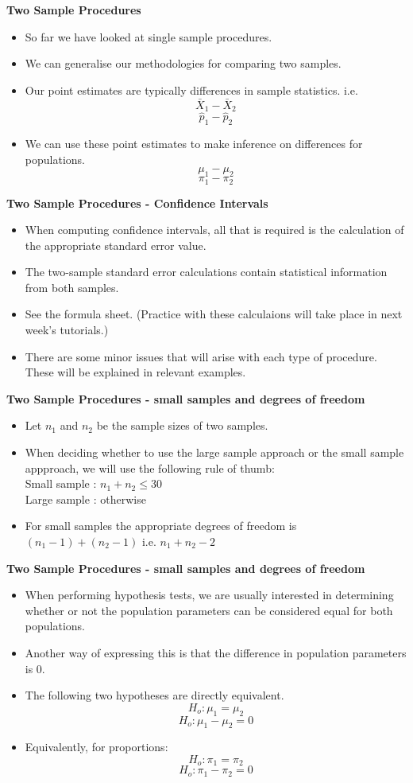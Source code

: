 \documentclass[a4]{beamer}
\begin{document}
\textbf{Two Sample Procedures}
\begin{itemize}
\item So far we have looked at single sample procedures.
\item We can generalise our methodologies for comparing two samples.
\item Our point estimates are typically differences in sample statistics. i.e.
\[ \bar{X}_1 - \bar{X}_2\]
\[\hat{p}_1 - \hat{p}_2 \]
\item We can use these point estimates to make inference on differences for populations.
\[ \mu_1 - \mu_2\]
\[ \pi_1 - \pi_2 \]
\end{itemize}


\noindent \textbf{Two Sample Procedures - Confidence Intervals}
\begin{itemize}
\item When computing confidence intervals, all that is required is the calculation of the appropriate standard error value.
\item The two-sample standard error calculations contain statistical information from both samples.
\item See the formula sheet. (Practice with these calculaions will take place in next week's tutorials.)
\item There are some minor issues that will arise with each type of procedure. These will be explained in relevant examples.
\end{itemize}


\noindent \textbf{Two Sample Procedures - small samples and degrees of freedom}
\begin{itemize}
\item Let $n_1$ and $n_2$ be the sample sizes of two samples.
\item When deciding whether to use the large sample approach or the small sample appproach, we will use the following rule of thumb: \\
Small sample : $n_1+n_2 \leq 30$\\
Large sample : otherwise\\
\item For small samples the appropriate degrees of freedom is $(n_1-1) + (n_2-1)$ i.e. $n_1 + n_2-2$ 
\end{itemize}


\textbf{Two Sample Procedures - small samples and degrees of freedom}
\begin{itemize}
\item When performing hypothesis tests, we are usually interested in determining whether or not the population parameters can be considered equal for both populations.
\item Another way of expressing this is that the difference in population parameters is 0. 
\item The following two hypotheses are directly equivalent.
\[ H_o :  \mu_1 = \mu_2\]
\[ H_o :  \mu_1 - \mu_2 =0\]
\item Equivalently, for proportions:
\[ H_o :  \pi_1 = \pi_2\]
\[ H_o :  \pi_1 - \pi_2 =0\]
\end{itemize}
\end{document}
